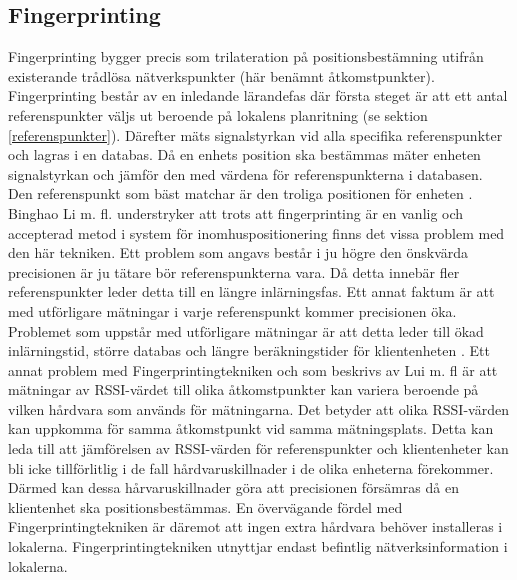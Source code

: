 \documentclass[swedish, a4paper,12pt]{article}
\begin{document}
\subsection{Fingerprinting}\label{fingerprinting}
Fingerprinting bygger precis som trilateration på positionsbestämning utifrån existerande trådlösa nätverkspunkter (här benämnt åtkomstpunkter). Fingerprinting består av en inledande lärandefas där första steget är att ett antal referenspunkter väljs ut beroende på lokalens planritning (se sektion \ref{referenspunkter}). Därefter mäts signalstyrkan vid alla specifika referenspunkter och lagras i en databas. %
Då en enhets position ska bestämmas mäter enheten signalstyrkan och jämför den med värdena för referenspunkterna i databasen. Den referenspunkt som bäst matchar är den troliga positionen för enheten \cite{IP1}\cite{jun2018low}.
Binghao Li m. fl. understryker att trots att fingerprinting är en vanlig och accepterad metod i system för inomhuspositionering finns det vissa problem med den här tekniken\cite{IP1}.
Ett problem som angavs består i ju högre den önskvärda precisionen är ju tätare bör referenspunkterna vara. Då detta innebär fler referenspunkter leder detta till en längre inlärningsfas. Ett annat faktum är att med utförligare mätningar i varje referenspunkt kommer precisionen öka. Problemet som uppstår med utförligare mätningar är att detta leder till ökad inlärningstid, större databas och längre beräkningstider för klientenheten \cite{IP1}. Ett annat problem med Fingerprintingtekniken och som beskrivs av Lui m. fl \cite{problem_with_RSSI} är att mätningar av RSSI-värdet till olika åtkomstpunkter kan variera beroende på vilken hårdvara som används för mätningarna. Det betyder att olika RSSI-värden kan uppkomma för samma åtkomstpunkt vid samma mätningsplats. Detta kan leda till att jämförelsen av RSSI-värden för referenspunkter och klientenheter kan bli icke tillförlitlig i de fall hårdvaruskillnader i de olika enheterna förekommer. Därmed kan dessa hårvaruskillnader göra att precisionen försämras då en klientenhet ska positionsbestämmas\cite{problem_with_RSSI}. En övervägande fördel med Fingerprintingtekniken är däremot att ingen extra hårdvara behöver installeras i lokalerna. Fingerprintingtekniken utnyttjar endast befintlig nätverksinformation i lokalerna.
\end{document}
